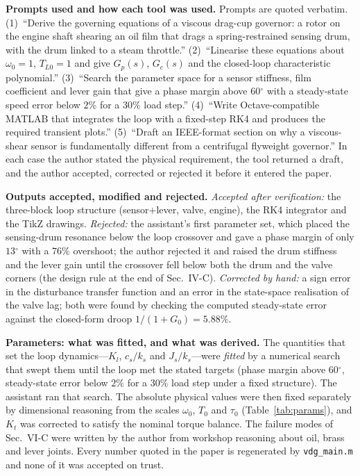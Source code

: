 \documentclass[conference]{IEEEtran}
\newcommand{\dg}{\ensuremath{^{\circ}}}
\begin{document}
\textbf{Prompts used and how each tool was used.} Prompts are quoted verbatim.
(1)~``Derive the governing equations of a viscous drag-cup governor: a rotor on the
engine shaft shearing an oil film that drags a spring-restrained sensing drum, with
the drum linked to a steam throttle.'' (2)~``Linearise these equations about
$\omega_0=1$, $T_{L0}=1$ and give $G_p(s)$, $G_c(s)$ and the closed-loop
characteristic polynomial.'' (3)~``Search the parameter space for a sensor
stiffness, film coefficient and lever gain that give a phase margin above $60\dg$
with a steady-state speed error below $2\%$ for a $30\%$ load step.'' (4)~``Write
Octave-compatible MATLAB that integrates the loop with a fixed-step RK4 and produces
the required transient plots.'' (5)~``Draft an IEEE-format section on why a
viscous-shear sensor is fundamentally different from a centrifugal flyweight
governor.'' In each case the author stated the physical requirement, the tool
returned a draft, and the author accepted, corrected or rejected it before it
entered the paper.

\textbf{Outputs accepted, modified and rejected.} \emph{Accepted after
verification:} the three-block loop structure (sensor$+$lever, valve, engine), the
RK4 integrator and the TikZ drawings. \emph{Rejected:} the assistant's first
parameter set, which placed the sensing-drum resonance below the loop crossover and
gave a phase margin of only $13\dg$ with a $76\%$ overshoot; the author rejected it
and raised the drum stiffness and the lever gain until the crossover fell below both
the drum and the valve corners (the design rule at the end of Sec.~IV-C).
\emph{Corrected by hand:} a sign error in the disturbance transfer function and an
error in the state-space realisation of the valve lag; both were found by checking
the computed steady-state error against the closed-form droop $1/(1+G_0)=5.88\%$.

\textbf{Parameters: what was fitted, and what was derived.} The quantities that set
the loop dynamics---$K_l$, $c_s/k_s$ and $J_s/k_s$---were \emph{fitted} by a
numerical search that swept them until the loop met the stated targets (phase margin
above $60\dg$, steady-state error below $2\%$ for a $30\%$ load step under a fixed
structure). The assistant ran that search. The absolute physical values were then
fixed separately by dimensional reasoning from the scales $\omega_0$, $T_0$ and
$\tau_0$ (Table~\ref{tab:params}), and $K_t$ was corrected to satisfy the nominal
torque balance. The failure modes of Sec.~VI-C were written by the author from
workshop reasoning about oil, brass and lever joints. Every number quoted in the
paper is regenerated by \texttt{vdg\_main.m} and none of it was accepted on trust.
\end{document}
